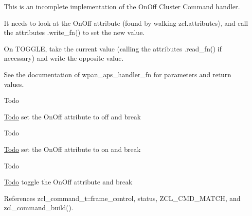This is an incomplete implementation of the On\+Off Cluster Command handler. 

It needs to look at the On\+Off attribute (found by walking zcl.\+attributes), and call the attribute\textquotesingle{}s .write\+\_\+fn() to set the new value.

On T\+O\+G\+G\+LE, take the current value (calling the attributes\textquotesingle{} .read\+\_\+fn() if necessary) and write the opposite value.

See the documentation of wpan\+\_\+aps\+\_\+handler\+\_\+fn for parameters and return values. \begin{DoxyRefDesc}{Todo}
\item[\hyperlink{todo__todo000017}{Todo}]set the On\+Off attribute to off and break \end{DoxyRefDesc}


\begin{DoxyRefDesc}{Todo}
\item[\hyperlink{todo__todo000018}{Todo}]set the On\+Off attribute to on and break \end{DoxyRefDesc}


\begin{DoxyRefDesc}{Todo}
\item[\hyperlink{todo__todo000019}{Todo}]toggle the On\+Off attribute and break \end{DoxyRefDesc}


References zcl\+\_\+command\+\_\+t\+::frame\+\_\+control, status, Z\+C\+L\+\_\+\+C\+M\+D\+\_\+\+M\+A\+T\+CH, and zcl\+\_\+command\+\_\+build().

